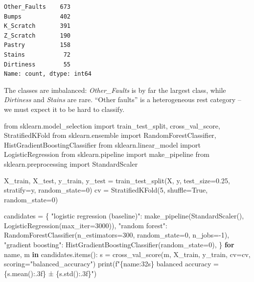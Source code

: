 \documentclass[
  letterpaper,
  DIV=11,
  numbers=noendperiod]{scrreprt}
\newenvironment{Shaded}{\begin{snugshade}}{\end{snugshade}}
\newcommand{\BuiltInTok}[1]{\textcolor[rgb]{0.00,0.23,0.31}{#1}}
\newcommand{\ControlFlowTok}[1]{\textcolor[rgb]{0.00,0.23,0.31}{\textbf{#1}}}
\newcommand{\DecValTok}[1]{\textcolor[rgb]{0.68,0.00,0.00}{#1}}
\newcommand{\FloatTok}[1]{\textcolor[rgb]{0.68,0.00,0.00}{#1}}
\newcommand{\ImportTok}[1]{\textcolor[rgb]{0.00,0.46,0.62}{#1}}
\newcommand{\KeywordTok}[1]{\textcolor[rgb]{0.00,0.23,0.31}{\textbf{#1}}}
\newcommand{\NormalTok}[1]{\textcolor[rgb]{0.00,0.23,0.31}{#1}}
\newcommand{\OperatorTok}[1]{\textcolor[rgb]{0.37,0.37,0.37}{#1}}
\newcommand{\SpecialCharTok}[1]{\textcolor[rgb]{0.37,0.37,0.37}{#1}}
\newcommand{\SpecialStringTok}[1]{\textcolor[rgb]{0.13,0.47,0.30}{#1}}
\newcommand{\StringTok}[1]{\textcolor[rgb]{0.13,0.47,0.30}{#1}}
\newcommand{\VariableTok}[1]{\textcolor[rgb]{0.07,0.07,0.07}{#1}}
\begin{document}
\begin{verbatim}
Other_Faults    673
Bumps           402
K_Scratch       391
Z_Scratch       190
Pastry          158
Stains           72
Dirtiness        55
Name: count, dtype: int64
\end{verbatim}

The classes are imbalanced: \emph{Other\_Faults} is by far the largest
class, while \emph{Dirtiness} and \emph{Stains} are rare. ``Other
faults'' is a heterogeneous rest category -- we must expect it to be
hard to classify.

\begin{Shaded}
\begin{Highlighting}[]
\ImportTok{from}\NormalTok{ sklearn.model\_selection }\ImportTok{import}\NormalTok{ train\_test\_split, cross\_val\_score, StratifiedKFold}
\ImportTok{from}\NormalTok{ sklearn.ensemble }\ImportTok{import}\NormalTok{ RandomForestClassifier, HistGradientBoostingClassifier}
\ImportTok{from}\NormalTok{ sklearn.linear\_model }\ImportTok{import}\NormalTok{ LogisticRegression}
\ImportTok{from}\NormalTok{ sklearn.pipeline }\ImportTok{import}\NormalTok{ make\_pipeline}
\ImportTok{from}\NormalTok{ sklearn.preprocessing }\ImportTok{import}\NormalTok{ StandardScaler}

\NormalTok{X\_train, X\_test, y\_train, y\_test }\OperatorTok{=}\NormalTok{ train\_test\_split(X, y, test\_size}\OperatorTok{=}\FloatTok{0.25}\NormalTok{, stratify}\OperatorTok{=}\NormalTok{y, random\_state}\OperatorTok{=}\DecValTok{0}\NormalTok{)}
\NormalTok{cv }\OperatorTok{=}\NormalTok{ StratifiedKFold(}\DecValTok{5}\NormalTok{, shuffle}\OperatorTok{=}\VariableTok{True}\NormalTok{, random\_state}\OperatorTok{=}\DecValTok{0}\NormalTok{)}

\NormalTok{candidates }\OperatorTok{=}\NormalTok{ \{}
    \StringTok{"logistic regression (baseline)"}\NormalTok{: make\_pipeline(StandardScaler(), LogisticRegression(max\_iter}\OperatorTok{=}\DecValTok{3000}\NormalTok{)),}
    \StringTok{"random forest"}\NormalTok{: RandomForestClassifier(n\_estimators}\OperatorTok{=}\DecValTok{300}\NormalTok{, random\_state}\OperatorTok{=}\DecValTok{0}\NormalTok{, n\_jobs}\OperatorTok{={-}}\DecValTok{1}\NormalTok{),}
    \StringTok{"gradient boosting"}\NormalTok{: HistGradientBoostingClassifier(random\_state}\OperatorTok{=}\DecValTok{0}\NormalTok{),}
\NormalTok{\}}
\ControlFlowTok{for}\NormalTok{ name, m }\KeywordTok{in}\NormalTok{ candidates.items():}
\NormalTok{    s }\OperatorTok{=}\NormalTok{ cross\_val\_score(m, X\_train, y\_train, cv}\OperatorTok{=}\NormalTok{cv, scoring}\OperatorTok{=}\StringTok{"balanced\_accuracy"}\NormalTok{)}
    \BuiltInTok{print}\NormalTok{(}\SpecialStringTok{f"}\SpecialCharTok{\{}\NormalTok{name}\SpecialCharTok{:32s\}}\SpecialStringTok{ balanced accuracy = }\SpecialCharTok{\{}\NormalTok{s}\SpecialCharTok{.}\NormalTok{mean()}\SpecialCharTok{:.3f\}}\SpecialStringTok{ ± }\SpecialCharTok{\{}\NormalTok{s}\SpecialCharTok{.}\NormalTok{std()}\SpecialCharTok{:.3f\}}\SpecialStringTok{"}\NormalTok{)}
\end{Highlighting}
\end{Shaded}
\end{document}
